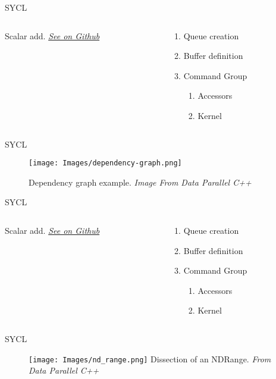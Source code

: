 \begin{frame}{SYCL}
\begin{columns}
  \begin{column}{0.7\textwidth}
    \centering
  
Scalar add. \href{{https://github.com/AdrianoMoreira08/TFG-SYCL/blob/main/sycl-examples/scalar_add.cc}}{\textit{See on Github}}
\end{column}
\begin{column}{0.3\textwidth}
  \begin{enumerate}
    \item Queue creation
    \item Buffer definition
    \item Command Group
    \begin{enumerate}
      \item Accessors
      \item Kernel
    \end{enumerate}
\end{enumerate}
\end{column}
\end{columns}
\end{frame}
\begin{frame}{SYCL}
  \begin{figure}[H]
  \centering
  \texttt{[image: Images/dependency-graph.png]}

  Dependency graph example. \textit{Image From Data Parallel C++}
\end{figure}
\end{frame}
\begin{frame}{SYCL}
  \begin{columns}
    \begin{column}{0.7\textwidth}
      \centering
    
  Scalar add. \href{{https://github.com/AdrianoMoreira08/TFG-SYCL/blob/main/sycl-examples/scalar_add.cc}}{\textit{See on Github}}
  \end{column}
  \begin{column}{0.3\textwidth}
    \begin{enumerate}
      \item Queue creation
      \item Buffer definition
      \item Command Group
      \begin{enumerate}
        \item Accessors
        \item Kernel
      \end{enumerate}
  \end{enumerate}
  \end{column}
  \end{columns}
  \end{frame}
\begin{frame}{SYCL}
  \begin{figure}[H]
    \centering
    \texttt{[image: Images/nd\_range.png]}
    Dissection of an NDRange. \textit{From Data Parallel C++}
  \end{figure}
\end{frame}
